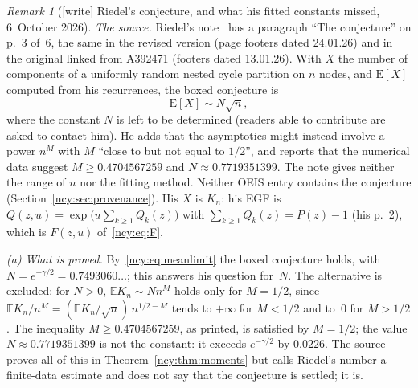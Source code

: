 \documentclass[11pt,letterpaper]{article}
\numberwithin{equation}{section}
\theoremstyle{remark}\newtheorem{remark}[theorem]{Remark}
\newcommand{\EE}{\mathbb E}
\theoremstyle{definition}\newtheorem{definition}[theorem]{Definition}\theoremstyle{plain}
\begin{document}
\begin{remark}[{[write]} Riedel's conjecture, and what his fitted constants missed, 6~October 2026]\label{ncy:rem:riedel}
\emph{The source.} Riedel's note~\cite{riedel} has a paragraph ``The
conjecture'' on p.~3 of~6, the same in the revised version (page footers
dated 24.01.26) and in the original linked from A392471 (footers dated
13.01.26). With $X$ the number of components of a uniformly random nested
cycle partition on $n$ nodes, and $\mathrm E[X]$ computed from his
recurrences, the boxed conjecture is
\[
 \mathrm E[X]\sim N\sqrt n ,
\]
where the constant $N$ is left to be determined (readers able to contribute
are asked to contact him). He adds that the asymptotics might instead
involve a power $n^M$ with $M$ ``close to but not equal to $1/2$'', and
reports that the numerical data suggest $M\ge0.4704567259$ and
$N\approx0.7719351399$. The note gives neither the range of $n$ nor the
fitting method. Neither OEIS entry contains the conjecture
(Section~\ref{ncy:sec:provenance}). His $X$ is $K_n$: his EGF is
$Q(z,u)=\exp\bigl(u\sum_{k\ge1}Q_k(z)\bigr)$ with
$\sum_{k\ge1}Q_k(z)=P(z)-1$ (his p.~2), which is $F(z,u)$
of~\eqref{ncy:eq:F}.

\emph{(a) What is proved.} By~\eqref{ncy:eq:meanlimit} the boxed conjecture
holds, with $N=e^{-\gamma/2}=0.7493060\ldots$; this answers his question
for~$N$. The alternative is excluded: for $N>0$, $\EE K_n\sim Nn^M$ holds
only for $M=1/2$, since $\EE K_n/n^M=(\EE K_n/\sqrt n)\,n^{1/2-M}$ tends to
$+\infty$ for $M<1/2$ and to~$0$ for $M>1/2$. The inequality
$M\ge0.4704567259$, as printed, is satisfied by $M=1/2$; the value
$N\approx0.7719351399$ is not the constant: it exceeds $e^{-\gamma/2}$ by
$0.0226$. The source proves all of this in Theorem~\ref{ncy:thm:moments} but
calls Riedel's number a finite-data estimate and does not say that the
conjecture is settled; it is.


\end{remark}
\end{document}
